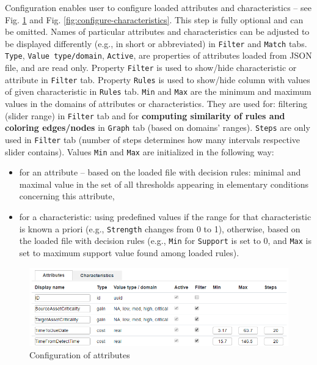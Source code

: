 \documentclass[12pt]{article}
\begin{document}
Configuration enables user to configure loaded attributes and characteristics -- see Fig. \ref{fig:configure-attributes} and Fig. \ref{fig:configure-characteristics}. This step is fully optional and can be omitted. Names of particular attributes and characteristics can be adjusted to be displayed differently (e.g., in short or abbreviated) in \texttt{Filter} and \texttt{Match} tabs. \texttt{Type}, \texttt{Value type/domain}, \texttt{Active}, are properties of attributes loaded from JSON file, and are read only. Property \texttt{Filter} is used to show/hide characteristic or attribute in \texttt{Filter} tab. Property \texttt{Rules} is used to show/hide column with values of given characteristic in \texttt{Rules} tab. \texttt{Min} and \texttt{Max} are the minimum and maximum values in the domains of attributes or characteristics. They are used for: filtering (slider range) in \texttt{Filter} tab and for \textbf{computing similarity of rules and coloring edges/nodes} in \texttt{Graph} tab (based on domains' ranges). \texttt{Steps} are only used in \texttt{Filter} tab (number of steps determines how many intervals respective slider contains). Values \texttt{Min} and \texttt{Max} are initialized in the following way:
\begin{itemize}
    \setlength\itemsep{0em}
    \item for an attribute -- based on the loaded file with decision rules: minimal and maximal value in the set of all thresholds appearing in elementary conditions concerning this attribute,
    \item for a characteristic: using predefined values if the range for that characteristic is known a priori (e.g., \texttt{Strength} changes from 0 to 1), otherwise, based on the loaded file with decision rules (e.g., \texttt{Min} for \texttt{Support} is set to 0, and \texttt{Max} is set to maximum support value found among loaded rules).
\end{itemize}

\begin{figure}[H]
    \centering
    \includegraphics[width=\textwidth]{figures/configure-attributes.png}
    \caption{Configuration of attributes}\label{fig:configure-attributes}
\end{figure}
\end{document}
